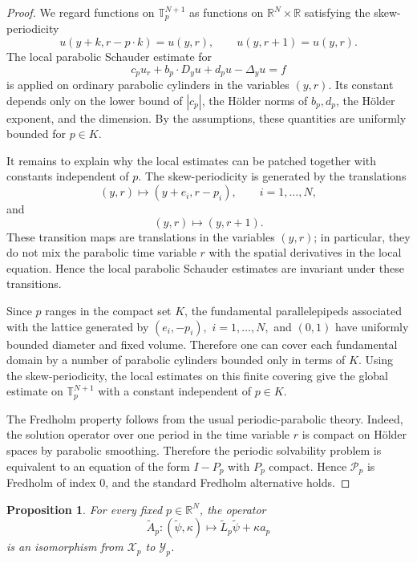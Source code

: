 \documentclass[preprint]{elsarticle}
\newtheorem{proposition}{Proposition}[section]
\numberwithin{equation}{section}
\begin{document}
\begin{proof}
We regard functions on $\mathbb T_p^{N+1}$ as functions on $\mathbb R^N\times\mathbb R$ satisfying the skew-periodicity
\begin{equation*}
u(y+k,r-p\cdot k)=u(y,r),
\qquad
u(y,r+1)=u(y,r).
\end{equation*}
The local parabolic Schauder estimate for
$$
c_pu_r+b_p\cdot D_yu+d_pu-\Delta_yu=f
$$
is applied on ordinary parabolic cylinders in the variables $(y,r)$. Its constant depends only on the lower bound of $|c_p|$, the Hölder norms of $b_p,d_p$, the Hölder exponent, and the dimension. By the assumptions, these quantities are uniformly bounded for $p\in K$.

It remains to explain why the local estimates can be patched together with constants independent of $p$. The skew-periodicity is generated by the translations
$$
(y,r)\mapsto(y+e_i,r-p_i),
\qquad i=1,\ldots,N,
$$
and
$$
(y,r)\mapsto(y,r+1).
$$
These transition maps are translations in the variables $(y,r)$; in particular, they do not mix the parabolic time variable $r$ with the spatial derivatives in the local equation. Hence the local parabolic Schauder estimates are invariant under these transitions.

Since $p$ ranges in the compact set $K$, the fundamental parallelepipeds associated with the lattice generated by
$
(e_i,-p_i),$ $ i=1,\ldots,N,
$
and
$
(0,1)
$
have uniformly bounded diameter and fixed volume. Therefore one can cover each fundamental domain by a number of parabolic cylinders bounded only in terms of $K$. Using the skew-periodicity, the local estimates on this finite covering give the global estimate on $\mathbb T_p^{N+1}$ with a constant independent of $p\in K$.

The Fredholm property follows from the usual periodic-parabolic theory. Indeed, the solution operator over one period in the time variable $r$ is compact on Hölder spaces by parabolic smoothing. Therefore the periodic solvability problem is equivalent to an equation of the form $I-P_p$ with $P_p$ compact. Hence $\mathcal P_p$ is Fredholm of index $0$, and the standard Fredholm alternative holds.
\end{proof}
\begin{proposition}
For every fixed $p\in\mathbb R^N$, the operator
$$
\widetilde A_p:
(\widetilde\psi,\kappa)\longmapsto
\widetilde L_p\widetilde\psi+\kappa a_p
$$
is an isomorphism from $\mathcal X_p$ to $\mathcal Y_p$.\label{isomorphism}
\end{proposition}
\end{document}
